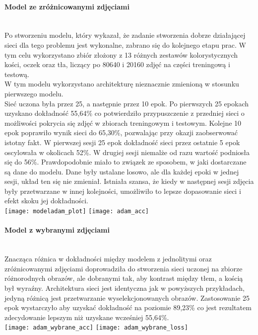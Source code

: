\paragraph{Model ze zróżnicowanymi zdjęciami} \mbox{}\\
Po stworzeniu modelu, który wykazał, że zadanie stworzenia dobrze działającej sieci dla
tego problemu jest wykonalne, zabrano się do kolejnego etapu prac. W tym celu
wykorzystano zbiór złożony z 13 różnych zestawów kolorystycznych kości, oczek oraz tła,
liczący po 80640 i 20160 zdjęć na części treningową i testową.\\
W tym modelu wykorzystano architekturę nieznacznie zmienioną w stosunku pierwszego modelu.\\
Sieć uczona była przez 25, a następnie przez 10 epok.
Po pierwszych 25 epokach uzyskano dokładność 55,64\% co potwierdziło przypuszczenie
z przedniej sieci o możliwości pokrycia się zdjęć w zbiorach treningowym i testowym.
Kolejne 10 epok poprawiło wynik sieci do 65,30\%, pozwalając przy okazji zaobserwować
istotny fakt. W pierwszej sesji 25 epok dokładność sieci przez ostatnie
5 epok oscylowała w okolicach 52\%. W drugiej sesji niemalże od razu wartość
podniosła się do 56\%. Prawdopodobnie miało to związek ze sposobem, w jaki dostarczane
są dane do modelu. Dane były ustalane losowo, ale dla każdej epoki w jednej sesji,
układ ten się nie zmieniał. Istniała szansa, że kiedy w następnej sesji zdjęcia
były przetwarzane w innej kolejności, umożliwiło to lepsze dopasowanie sieci i efekt
skoku jej dokładności.\\
\texttt{[image: modeladam\_plot]}
\texttt{[image: adam\_acc]}

\paragraph{Model z wybranymi zdjęciami} \mbox{}\\
Znacząca różnica w dokładności między modelem z jednolitymi oraz zróżnicowanymi zdjęciami
doprowadziła do stworzenia sieci uczonej na zbiorze różnorodnych obrazów, ale
dobranymi tak, aby kontrast między tłem, a kością był wyraźny. Architektura sieci
jest identyczna jak w powyższych przykładach, jedyną różnicą jest przetwarzanie
wyselekcjonowanych obrazów. Zastosowanie 25 epok wystarczyło aby uzyskać dokładność
na poziomie 89,23\% co jest rezultatem zdecydowanie lepszym niż uzyskane wcześniej 55,64\%.\\
\texttt{[image: adam\_wybrane\_acc]}
\texttt{[image: adam\_wybrane\_loss]}

